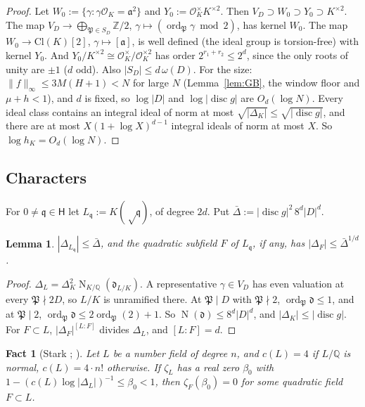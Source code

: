 \documentclass[11pt]{amsart}
\newtheorem{lemma}[theorem]{Lemma}
\newtheorem{fact}[theorem]{Fact}
\theoremstyle{definition}
\newcommand{\Z}{\mathbb{Z}}
\newcommand{\Q}{\mathbb{Q}}
\newcommand{\cO}{\mathcal{O}}
\newcommand{\sH}{\mathsf{H}}
\newcommand{\fq}{\mathfrak{q}}
\newcommand{\fa}{\mathfrak{a}}
\newcommand{\fP}{\mathfrak{P}}
\newcommand{\ord}{\operatorname{ord}}
\newcommand{\disc}{\operatorname{disc}}
\newcommand{\Norm}{\operatorname{N}}
\begin{document}
\begin{proof}
Let $W_0:=\{\gamma:\gamma\cO_K=\fa^2\}$ and $Y_0:=\cO_K^\times K^{\times2}$. Then $V_D\supset W_0\supset Y_0\supset K^{\times2}$. The map
$V_D\to\bigoplus_{\fP\in S_D}\Z/2$, $\gamma\mapsto(\ord_\fP\gamma\bmod2)$, has kernel $W_0$. The map $W_0\to\mathrm{Cl}(K)[2]$,
$\gamma\mapsto[\fa]$, is well defined (the ideal group is torsion-free) with kernel $Y_0$. And $Y_0/K^{\times2}\cong\cO_K^\times/\cO_K^{\times2}$ has order
$2^{r_1+r_2}\le2^d$, since the only roots of unity are $\pm1$ ($d$ odd). Also $|S_D|\le d\,\omega(D)$. For the size: $\|f\|_\infty\le3M(H+1)<N$ for large $N$ (Lemma~\ref{lem:GB}, the window floor and $\mu+h<1$), and
$d$ is fixed, so $\log|D|$ and $\log|\disc g|$ are $O_d(\log N)$. Every ideal class contains an integral ideal of norm at most
$\sqrt{|\Delta_K|}\le\sqrt{|\disc g|}$, and there are at most $X(1+\log X)^{d-1}$ integral ideals of norm at most $X$. So $\log h_K=O_d(\log N)$.
\end{proof}

\subsection{Characters}\label{sec:chars}
For $0\ne\fq\in\sH$ let $L_\fq:=K(\sqrt\fq)$, of degree $2d$. Put $\bar\Delta:=|\disc g|^2\,8^d|D|^d$.

\begin{lemma}\label{lem:disc}
$|\Delta_{L_\fq}|\le\bar\Delta$, and the quadratic subfield $F$ of $L_\fq$, if any, has $|\Delta_F|\le\bar\Delta^{1/d}$.
\end{lemma}

\begin{proof}
$\Delta_{L}=\Delta_K^2\Norm_{K/\Q}(\mathfrak d_{L/K})$. A representative $\gamma\in V_D$ has even valuation at every $\fP\nmid2D$, so $L/K$ is
unramified there. At $\fP\mid D$ with $\fP\nmid2$, $\ord_\fP\mathfrak d\le1$, and at $\fP\mid2$, $\ord_\fP\mathfrak d\le2\ord_\fP(2)+1$. So
$\Norm(\mathfrak d)\le8^d|D|^d$, and $|\Delta_K|\le|\disc g|$. For $F\subset L$, $|\Delta_F|^{[L:F]}$ divides $\Delta_L$, and $[L:F]=d$.
\end{proof}

\begin{fact}[Stark {\cite[Lemma~8]{stark1974}}; {\cite[Fact~6.22]{lv2018}}]\label{fact:Stark}
Let $L$ be a number field of degree $n$, and $c(L)=4$ if $L/\Q$ is normal, $c(L)=4\cdot n!$ otherwise. If $\zeta_L$ has a real zero $\beta_0$ with
$1-(c(L)\log|\Delta_L|)^{-1}\le\beta_0<1$, then $\zeta_F(\beta_0)=0$ for some quadratic field $F\subset L$.
\end{fact}
\end{document}
